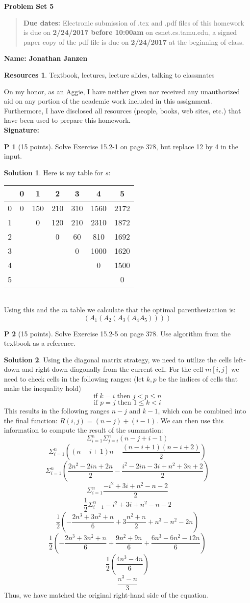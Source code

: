 \documentclass{article}
\theoremstyle{definition}
\newtheorem{problem}{P}
\newtheorem*{solution}{Solution}
\newtheorem*{resources}{Resources}
\newcommand{\name}[1]{\noindent\textbf{Name: #1}}
\newcommand{\honor}{\noindent On my honor, as an Aggie, I have neither
  given nor received any unauthorized aid on any portion of the
  academic work included in this assignment. Furthermore, I have
  disclosed all resources (people, books, web sites, etc.) that have
  been used to prepare this homework. \\[1ex]
 \textbf{Signature:} \underline{\hspace*{5cm}} }
\newcommand{\problemset}[1]{\begin{center}\textbf{Problem Set #1}\end{center}}
\newcommand{\duedate}[2]{\begin{quote}\textbf{Due dates:} Electronic submission of .tex
    and .pdf files of this homework is due on \textbf{#1} on csnet.cs.tamu.edu, a signed paper copy
    of the pdf file is due on \textbf{#2} at the beginning of
    class. \end{quote} }
\begin{document}
\problemset{5}
\duedate{2/24/2017 before 10:00am}{2/24/2017}
\name{Jonathan Janzen}
\begin{resources}
Textbook, lectures, lecture slides, talking to classmates
\end{resources}
\honor
\newpage


\begin{problem}[15 points]
Solve Exercise 15.2-1 on page 378, but replace 12 by 4 in the input. 
\end{problem}
\begin{solution}
Here is my table for $s$:\\
\begin{tabular}{| c | c c c c c c |}
\hline
 & 0 & 1 & 2 & 3 & 4 & 5\\
 \hline
0 & 0 & 150 & 210 & 310 & 1560 & 2172\\
1 &  & 0 & 120 & 210 & 2310 & 1872\\
2 &  &  & 0 & 60 & 810 & 1692\\
3 &  &  &  & 0 & 1000 & 1620\\
4 &  &  &  &  & 0 & 1500\\
5 &  &  &  &  &  & 0\\
\hline
\end{tabular}\\
Using this and the $m$ table we calculate that the optimal parenthesization is:
$$(A_1(A_2(A_3(A_4A_5))))$$
\end{solution}

\begin{problem}[15 points]
Solve Exercise 15.2-5 on page 378. Use algorithm from the textbook as
a reference. 
\end{problem}
\begin{solution}
Using the diagonal matrix strategy, we need to utilize the cells left-down and right-down diagonally from the current cell. For the cell $m[i, j]$ we need to check cells in the following ranges: (let $k,p$ be the indices of cells that make the inequality hold)\\
$$\text{if } k=i \text{ then } j < p \leq n$$
$$\text{if } p=j \text{ then } 1 \leq k < i$$
This results in the following ranges $n-j$ and $k-1$, which can be combined into the final function: $R(i,j) = (n-j) + (i-1)$. We can then use this information to compute the result of the summation:
$$ \Sigma_{i=1}^n \Sigma_{j=i}^n (n - j + i - 1) $$
$$ \Sigma_{i=1}^n ((n-i+1)n - \frac{(n-i+1)(n-i+2)}{2}) $$
$$ \Sigma_{i=1}^n (\frac{2n^2-2in+2n}{2} - \frac{i^2-2in-3i+n^2+3n+2}{2}) $$
$$ \Sigma_{i=1}^n \frac{-i^2+3i+n^2-n-2}{2} $$
$$ \frac{1}{2} \Sigma_{i=1}^n -i^2+3i+n^2-n-2 $$
$$ \frac{1}{2} (-\frac{2n^3+3n^2+n}{6}+3\frac{n^2 + n}{2}+n^3-n^2-2n) $$
$$ \frac{1}{2} (-\frac{2n^3+3n^2+n}{6}+\frac{9n^2 + 9n}{6}+\frac{6n^3-6n^2-12n}{6}) $$
$$ \frac{1}{2} (\frac{4n^3-4n}{6}) $$
$$ \frac{n^3-n}{3} $$
Thus, we have matched the original right-hand side of the equation.
\end{solution}
\end{document}
